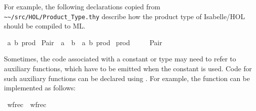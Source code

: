 \begin{isabellebody}
\begin{isamarkuptext}
  For example, the following declarations copied from \verb|~~/src/HOL/Product_Type.thy| describe how the product type of
  Isabelle/HOL should be compiled to ML.%
\end{isamarkuptext}%
\isamarkuptrue%
\isamarkupfalse%
\ {}{}a{}\ {}b{}\ prod\isanewline
{}\isamarkupfalse%
\ Pair\ {}{}\ {}{}a\ {}\ {}b\ {}\ {}{}a{}\ {}b{}\ prod{}\isanewline
\isanewline
{}\isamarkupfalse%
\ prod\ \ {}{}{}{}\ {}{}\ {}{}{}{}\isanewline
{}\isamarkupfalse%
\ Pair\ \ {}{}{}{}{}{}\ {}{}{}{}%
\begin{isamarkuptext}%
Sometimes, the code associated with a constant or type may
  need to refer to auxiliary functions, which have to be emitted when
  the constant is used. Code for such auxiliary functions can be
  declared using \hyperlink{keyword.attach}{\mbox{}}. For example, the 
  function can be implemented as follows:%
\end{isamarkuptext}%
\isamarkuptrue%
\isamarkupfalse%
\ wfrec\ \ {}{}{}wfrec{}{}{}\ \ \isanewline

\end{isabellebody}
